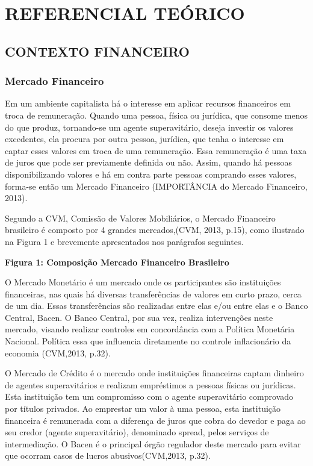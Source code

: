 
\newpage
\chapter[REFERENCIAL TEORICO]{REFERENCIAL TEÓRICO}
\section{CONTEXTO FINANCEIRO}
\subsection{Mercado Financeiro}

Em um ambiente capitalista há o interesse em aplicar recursos financeiros em troca de remuneração. Quando uma pessoa, física ou jurídica, que consome menos do que produz, tornando-se um agente superavitário, deseja investir os valores excedentes, ela procura por outra pessoa, jurídica, que tenha o interesse em captar esses valores em troca de uma remuneração. Essa remuneração é uma taxa de juros que pode ser previamente definida ou não. Assim, quando há pessoas disponibilizando valores e há em contra parte pessoas comprando esses valores, forma-se então um Mercado Financeiro (IMPORTÂNCIA do Mercado Financeiro, 2013).

Segundo a CVM, Comissão de Valores Mobiliários, o Mercado Financeiro brasileiro é composto por 4 grandes mercados,(CVM, 2013, p.15), como ilustrado na Figura 1 e brevemente apresentados nos parágrafos seguintes.

\textbf{Figura 1: Composição Mercado Financeiro Brasileiro}

O Mercado Monetário é um mercado onde os participantes são instituições financeiras, nas quais há diversas transferências de valores em curto prazo, cerca de um dia. Essas transferências são realizadas entre elas e/ou entre elas e o Banco Central, Bacen. O Banco Central, por sua vez, realiza intervenções neste mercado, visando realizar controles em concordância com a Política Monetária Nacional. Política essa que influencia diretamente no controle inflacionário da economia (CVM,2013, p.32).

O Mercado de Crédito é o mercado onde instituições financeiras captam dinheiro de agentes superavitários e realizam empréstimos a pessoas físicas ou jurídicas. Esta instituição tem um compromisso com o agente superavitário comprovado por títulos privados. Ao emprestar um valor à uma pessoa, esta instituição financeira é remunerada com a diferença de juros que cobra do devedor e paga ao seu credor (agente superavitário), denominado spread, pelos serviços de intermediação. O Bacen é o principal órgão regulador deste mercado para evitar que ocorram casos de lucros abusivos(CVM,2013, p.32).

